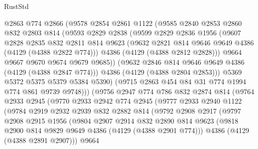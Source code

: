 \begin{lexlean}{RustStd}
\begin{coremodule}
              @2863
              @774
              @2866
              (@9578
                @2854
                @2861
                @1122
                (@9585
                  @2840
                  @2853
                  @2860
                  @832
                  @2803
                  @814
                  (@9593
                    @2829
                    @2838
                    (@9599
                      @2829
                      @2836
                      @1956
                      (@9607
                        @2828
                        @2835
                        @832
                        @2811
                        @814
                        @9623
                        (@9632 @2821 @814 @9646 @9649 @4386 (@4129 (@4388 @2822 @774)))
                        @4386
                        (@4129 (@4388 @2812 @2828)))
                      @9664
                      @9667
                      @9670
                      @9674
                      @9679
                      @9685))
                  (@9632 @2846 @814 @9646 @9649 @4386 (@4129 (@4388 @2847 @774)))
                  @4386
                  (@4129 (@4388 @2804 @2853)))
                @5369
                @5372
                @5375
                @5379
                @5384
                @5390)
              (@9715 @2863 @454 @84 @31 @774 @1994 @774 @861 @9739 @9748)))
          (@9756
            @2947
            @774
            @786
            @832
            @2874
            @814
            (@9764
              @2933
              @2945
              (@9770
                @2933
                @2942
                @774
                @2945
                (@9777
                  @2933
                  @2940
                  @1122
                  (@9784
                    @2919
                    @2932
                    @2939
                    @832
                    @2882
                    @814
                    (@9792
                      @2908
                      @2917
                      (@9797
                        @2908
                        @2915
                        @1956
                        (@9804
                          @2907
                          @2914
                          @832
                          @2890
                          @814
                          @9623
                          (@9818 @2900 @814 @9829 @9649 @4386 (@4129 (@4388 @2901 @774)))
                          @4386
                          (@4129 (@4388 @2891 @2907)))
                        @9664

\end{coremodule}
\end{lexlean}

